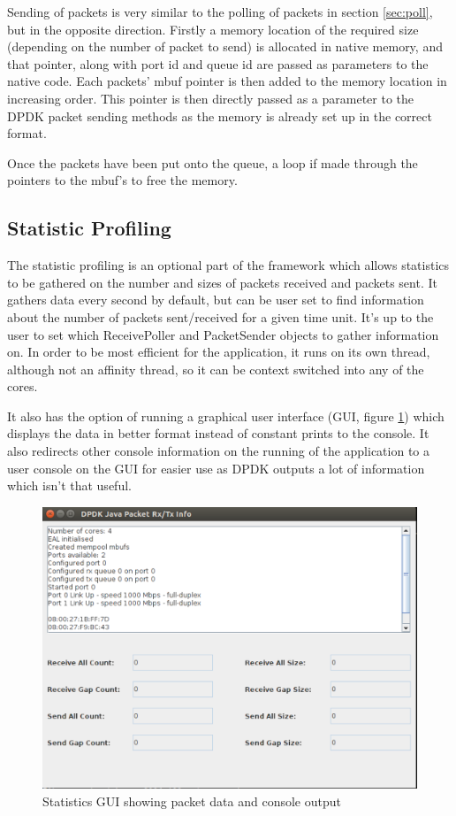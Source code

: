 \documentclass[final_report.tex]{subfiles}
\begin{document}
Sending of packets is very similar to the polling of packets in section \ref{sec:poll}, but in the opposite direction. Firstly a memory location of the required size (depending on the number of packet to send) is allocated in native memory, and that pointer, along with port id and queue id are passed as parameters to the native code. Each packets' mbuf pointer is then added to the memory location in increasing order. This pointer is then directly passed as a parameter to the DPDK packet sending methods as the memory is already set up in the correct format.

Once the packets have been put onto the queue, a loop if made through the pointers to the mbuf's to free the memory.

\subsection{Statistic Profiling}
The statistic profiling is an optional part of the framework which allows statistics to be gathered on the number and sizes of packets received and packets sent. It gathers data every second by default, but can be user set to find information about the number of packets sent/received for a given time unit. It's up to the user to set which ReceivePoller and PacketSender objects to gather information on. In order to be most efficient for the application, it runs on its own thread, although not an affinity thread, so it can be context switched into any of the cores.

It also has the option of running a graphical user interface (GUI, figure \ref{fig:gui}) which displays the data in better format instead of constant prints to the console. It also redirects other console information on the running of the application to a user console on the GUI for easier use as DPDK outputs a lot of information which isn't that useful.

\begin{figure}[H]
	\centering
	\includegraphics[width=\textwidth]{img/gui.png}
	\caption{Statistics GUI showing packet data and console output}
	\label{fig:gui}
\end{figure}
\end{document}
